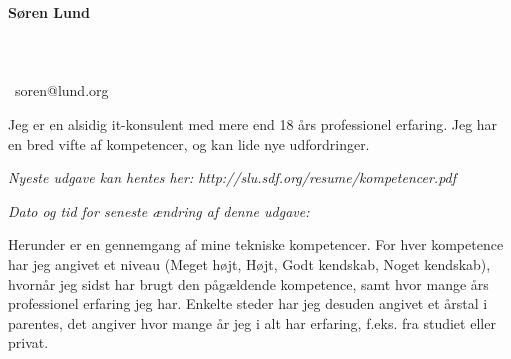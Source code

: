 \documentclass[a4paper,11pt]{article}
\newcommand\redacted{[skjult i online version]}
\newcommand\myaddressone{\redacted}
\newcommand\myaddresstwo{\redacted}
\newcommand\myphone{\redacted}
\begin{document}
\centerline{}
\centerline{}

\begin{minipage}[b]{0.30\textwidth}
  \selectfont%
  \textbf{Søren Lund} \\
  \myaddressone \\
  \myaddresstwo \\
  \myphone \\
  \Email\ soren@lund.org
\end{minipage}%
\hfill
\begin{minipage}[b]{0.30\textwidth}
  \selectfont%
  Jeg er en alsidig it-konsulent med
  mere end 18 års professionel
  erfaring. Jeg har en bred vifte af
  kompetencer, og
  kan lide nye udfordringer.
\end{minipage}

\bigskip
\centerline{\small\textit{Nyeste udgave kan hentes her: http://slu.sdf.org/resume/kompetencer.pdf}}
\centerline{\small\textit{Dato og tid for seneste ændring af denne udgave: }}

\bigskip
\bigskip

\newcommand\High{Meget højt}
\newcommand\high{Højt}
\newcommand\know{Godt kendskab}
\newcommand\some{Noget kendskab}

Herunder er en gennemgang af mine tekniske kompetencer. For hver
kompetence har jeg angivet et niveau (\High, \high, \know, \some),
hvornår jeg sidst har brugt den pågældende kompetence, samt hvor
mange års professionel erfaring jeg har. Enkelte steder har jeg
desuden angivet et årstal i parentes, det angiver hvor mange år jeg i
alt har erfaring, f.eks. fra studiet eller privat.
\end{document}
